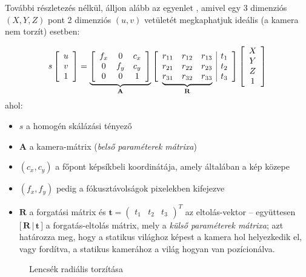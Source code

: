 További részletezés nélkül, álljon alább az egyenlet \cite{camera-calib}, amivel egy 3 dimenziós $(X, Y, Z)$ pont 2 dimenziós $(u, v)$ vetületét megkaphatjuk ideális (a kamera nem torzít) esetben:

\[s \left[\begin{array}{c}
u \\ 
v \\
1
\end{array}\right] = \underbrace{\left[\begin{array}{ccc}
f_x & 0 & c_x \\ 
0 & f_y & c_y \\
0 & 0 & 1
\end{array}\right]}_{\mathbf{A}} \left[\begin{array}{ccc|c}
r_{11} & r_{12} & r_{13} & t_1 \\ 
r_{21} & r_{22} & r_{23} & t_2 \\
\undermat{\mathbf{R}}{r_{31} & r_{32} & r_{33}} & t_3 \\
\end{array}\right] \left[\begin{array}{c}
X \\ 
Y \\
Z \\
1
\end{array}\right]\]
ahol:
\begin{itemize}[itemsep=0pt]
\item $s$ a homogén skálázási tényező
\item $\mathbf{A}$ a kamera-mátrix (\textit{belső paraméterek mátrixa})
\item $(c_x, c_y)$ a főpont képsíkbeli koordinátája, amely általában a kép közepe
\item $(f_x, f_y)$ pedig a fókusztávolságok pixelekben kifejezve
\item $\mathbf{R}$ a forgatási mátrix és $\mathbf{t} = \left(\begin{array}{ccc}t_1 & t_2 & t_3\end{array}\right)^T$ az eltolás-vektor -- együttesen $\Big[\,\mathbf{R}\,|\,\mathbf{t}\,\Big]$ a forgatás-eltolás mátrix, mely a \textit{külső paraméterek mátrixa}; azt határozza meg, hogy a statikus világhoz képest a kamera hol helyezkedik el, vagy fordítva, a statikus kamerához a világ hogyan van pozícionálva.
\end{itemize}

\begin{figure}[tbh]
\centering
\caption{Lencsék radiális torzítása \label{fig:radial-distortion}}
\end{figure}

